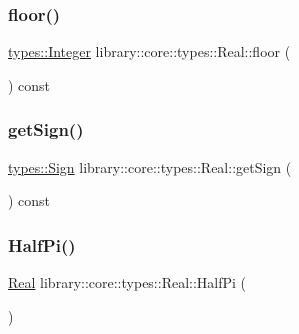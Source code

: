 \mbox{\label{classlibrary_1_1core_1_1types_1_1_real_ab25f3250b107fda48e86964792854b94}} 
\subsubsection{\texorpdfstring{floor()}{floor()}}
{\footnotesize\ttfamily \mbox{\hyperlink{classlibrary_1_1core_1_1types_1_1_integer}{types\+::\+Integer}} library\+::core\+::types\+::\+Real\+::floor (\begin{DoxyParamCaption}{ }\end{DoxyParamCaption}) const}

\mbox{\label{classlibrary_1_1core_1_1types_1_1_real_a0e92ad5d5a946dcc64385e1bf47003c8}} 
\subsubsection{\texorpdfstring{getSign()}{getSign()}}
{\footnotesize\ttfamily \mbox{\hyperlink{namespacelibrary_1_1core_1_1types_a06d9eaa410d43a0fa3f383040618e87d}{types\+::\+Sign}} library\+::core\+::types\+::\+Real\+::get\+Sign (\begin{DoxyParamCaption}{ }\end{DoxyParamCaption}) const}

\mbox{\label{classlibrary_1_1core_1_1types_1_1_real_a5047de46000e05369231c22c144d1c9c}} 
\subsubsection{\texorpdfstring{HalfPi()}{HalfPi()}}
{\footnotesize\ttfamily \mbox{\hyperlink{classlibrary_1_1core_1_1types_1_1_real}{Real}} library\+::core\+::types\+::\+Real\+::\+Half\+Pi (\begin{DoxyParamCaption}{ }\end{DoxyParamCaption})\hspace{0.3cm}{\ttfamily [static]}}

